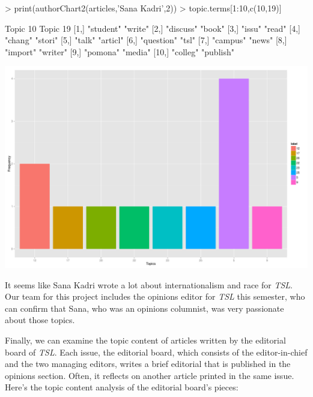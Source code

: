 \documentclass[a4paper]{article}
\begin{document}
\begin{Schunk}
\begin{Sinput}
> print(authorChart2(articles,'Sana Kadri',2))
> topic.terms[1:10,c(10,19)]
\end{Sinput}
\begin{Soutput}
      Topic 10   Topic 19 
 [1,] "student"  "write"  
 [2,] "discuss"  "book"   
 [3,] "issu"     "read"   
 [4,] "chang"    "stori"  
 [5,] "talk"     "articl" 
 [6,] "question" "tsl"    
 [7,] "campus"   "news"   
 [8,] "import"   "writer" 
 [9,] "pomona"   "media"  
[10,] "colleg"   "publish"
\end{Soutput}
\end{Schunk}
\includegraphics{FinalProject-011}

It seems like Sana Kadri wrote a lot about internationalism and race for \textit{TSL}. Our team for this project includes the opinions editor for \textit{TSL} this semester, who can confirm that Sana, who was an opinions columnist, was very passionate about those topics.

Finally, we can examine the topic content of articles written by the editorial board of \textit{TSL}. Each issue, the editorial board, which consists of the editor-in-chief and the two managing editors, writes a brief editorial that is published in the opinions section. Often, it reflects on another article printed in the same issue. Here's the topic content analysis of the editorial board's pieces:
\end{document}
